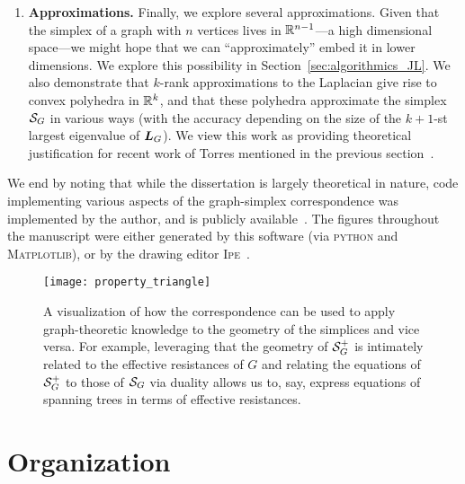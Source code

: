 \begin{itemize}
\begin{enumerate}
		\item {\bf Approximations.} Finally, we explore several approximations. Given that  the simplex of a graph with $n$ vertices lives in $\mathbb{R}^{n-1}$---a high dimensional  space---we might hope that we can ``approximately'' embed it  in  lower dimensions. We explore this possibility in Section~\ref{sec:algorithmics_JL}. We also demonstrate that $k$-rank approximations  to  the Laplacian give rise to convex polyhedra in $\mathbb{R}^k$, and that these polyhedra approximate the simplex $\mathcal{S}_G$ in various ways (with the accuracy depending on the  size of the $k+1$-st  largest  eigenvalue of $\vb*{L}_G$). We view this work as providing theoretical justification for recent work of Torres \etal mentioned  in  the previous section~\cite{torres2019geometric}.  
	\end{enumerate}

\end{itemize}



We  end by noting that while the dissertation is largely theoretical  in nature, code implementing various  aspects of the  graph-simplex correspondence was implemented by the author, and is publicly available~\cite{chugg2019graph}. The figures throughout the manuscript were either generated by this software (via \textsc{python} and \textsc{Matplotlib}),  or by the drawing editor \textsc{Ipe}~\cite{cheong2014ipe}.    

\begin{figure}
	\centering
	\texttt{[image: property\_triangle]}
	\caption{A visualization of how the correspondence can be used to apply graph-theoretic knowledge to the geometry  of the simplices and vice versa. For example, leveraging that the geometry of $\mathcal{S}_G^+$ is intimately related to the effective resistances of $G$ and relating the equations of $\mathcal{S}_G^+$  to those of $\mathcal{S}_G$ via duality allows us  to, say, express equations of spanning trees in terms of effective resistances.  }
	\label{fig:property_triangle}
\end{figure}


\section{Organization}
\label{sec:intro_organization}

